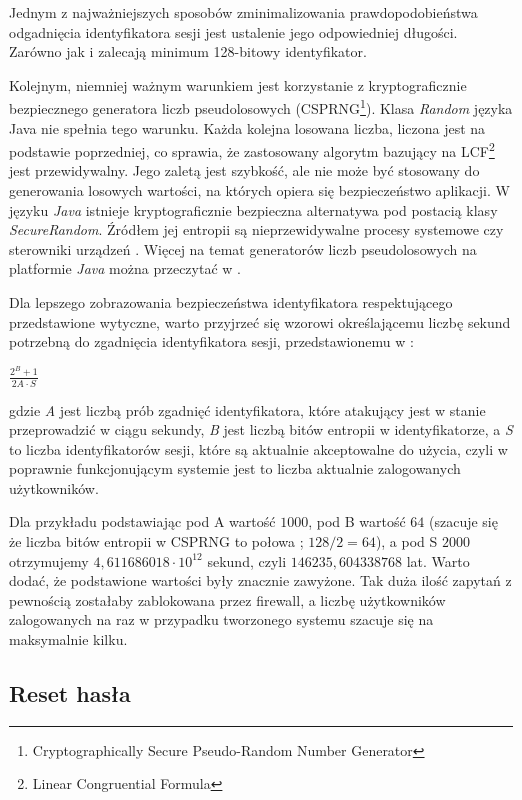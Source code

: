 \documentclass[11pt]{aghdpl}
\begin{document}
Jednym z najważniejszych sposobów zminimalizowania prawdopodobieństwa odgadnięcia identyfikatora sesji jest ustalenie jego odpowiedniej długości. Zarówno \cite{SId} jak i \cite{SeMa08} zalecają minimum 128-bitowy identyfikator.

Kolejnym, niemniej ważnym warunkiem jest korzystanie z kryptograficznie bezpiecznego generatora liczb pseudolosowych (CSPRNG\footnote{Cryptographically Secure Pseudo-Random Number Generator}). Klasa \emph{Random} języka Java nie spełnia tego warunku. Każda kolejna losowana liczba, liczona jest na podstawie poprzedniej, co sprawia, że zastosowany algorytm bazujący na LCF\footnote{Linear Congruential Formula} jest przewidywalny. Jego zaletą jest szybkość, ale nie może być stosowany do generowania losowych wartości, na których opiera się bezpieczeństwo aplikacji. W języku \emph{Java} istnieje kryptograficznie bezpieczna alternatywa pod postacią klasy \emph{SecureRandom}. Źródłem jej entropii są nieprzewidywalne procesy systemowe czy sterowniki urządzeń \cite{RND}. Więcej na temat generatorów liczb pseudolosowych na platformie \emph{Java} można przeczytać w \cite{SRNGiJ}.

Dla lepszego zobrazowania bezpieczeństwa identyfikatora respektującego przedstawione wytyczne, warto przyjrzeć się wzorowi określającemu liczbę sekund potrzebną do zgadnięcia identyfikatora sesji, przedstawionemu w \cite{SId}:

$\frac{2^{B} + 1}{2A \cdot S}$

gdzie \emph{A} jest liczbą prób zgadnięć identyfikatora, które atakujący jest w stanie przeprowadzić w ciągu sekundy, \emph{B} jest liczbą bitów entropii w identyfikatorze, a \emph{S} to liczba identyfikatorów sesji, które są aktualnie akceptowalne do użycia, czyli w poprawnie funkcjonującym systemie jest to liczba aktualnie zalogowanych użytkowników.

Dla przykładu podstawiając pod A wartość $1000$, pod B wartość $64$ (szacuje się że liczba bitów entropii w CSPRNG to połowa \cite{SId}; $128/2=64$), a pod S $2000$ otrzymujemy $4,611686018\cdot10^{12}$ sekund, czyli $146235,604338768$ lat. Warto dodać, że podstawione wartości były znacznie zawyżone. Tak duża ilość zapytań z pewnością zostałaby zablokowana przez firewall, a liczbę użytkowników zalogowanych na raz w przypadku tworzonego systemu szacuje się na maksymalnie kilku.

\subsection{Reset hasła}
\end{document}
